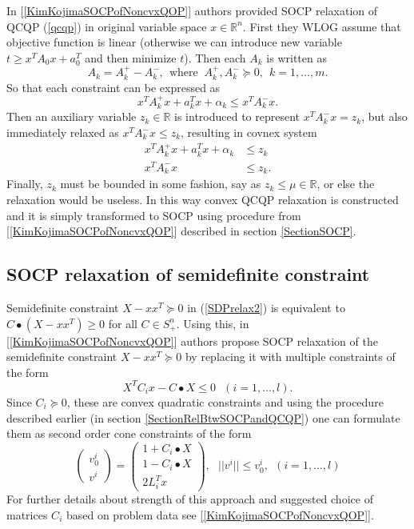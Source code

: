 \documentclass[10pt,oneside]{book}
\theoremstyle{definition}
\begin{document}
In [\ref{KimKojimaSOCPofNoncvxQOP}] authors provided SOCP relaxation of QCQP (\ref{qcqp}) in original variable space $x\in \mathbb{R}^n$. First they WLOG assume that objective function is linear (otherwise we can introduce new variable $t\geq x^TA_0x + a_0^T$ and then minimize $t$). Then each $A_k$ is written as 
$$A_k=A_k^+ -A_k^-, \ \ \mbox{where } \ A_k^+, A_k^- \succeq 0, \ \ k=1,\dots ,m.$$ 
So that each constraint can be expressed as 
$$x^TA_k^+x + a_k^Tx + \alpha_k \leq x^TA_k^-x.$$
Then an auxiliary variable $z_k\in \mathbb{R}$ is introduced to represent $x^TA_k^-x = z_k$, but also immediately relaxed as $x^TA_k^-x \leq z_k$, resulting in covnex system
\begin{equation}
\begin{array}{rl}
x^TA_k^+x + a_k^Tx + \alpha_k &\leq z_k  \\
x^TA_k^-x & \leq z_k.
\end{array} 
\end{equation}
Finally, $z_k$ must be bounded in some fashion, say as $z_k\leq \mu \in \mathbb{R}$, or else the relaxation would be useless. In this way convex QCQP relaxation is constructed and it is simply transformed to SOCP using procedure from [\ref{KimKojimaSOCPofNoncvxQOP}] described in section \ref{SectionSOCP}.

\subsection{SOCP relaxation of semidefinite constraint}

Semidefinite constraint $X-xx^T\succeq 0$  in (\ref{SDPrelax2}) is equivalent to $C\bullet(X-xx^T)\geq 0$ for all $C\in S^n_+$. Using this, in [\ref{KimKojimaSOCPofNoncvxQOP}] authors propose SOCP relaxation of the semidefinite constraint $X-xx^T\succeq 0$ by replacing it with multiple constraints of the form 
$$X^TC_ix-C\bullet X \leq 0 \ \ \ (i=1,\dots ,l).$$ 
Since $C_i\succeq 0$, these are convex quadratic constraints and using the procedure described earlier (in section \ref{SectionRelBtwSOCPandQCQP}) one can formulate them as second order cone constraints of the form
\begin{equation}
\label{SOCPRelaxOfPSDconstraint}
\left(\begin{array}{c}
v^i_0\\
v^i
\end{array}\right)
= \left(\begin{array}{c}
1+C_i\bullet X\\
1-C_i\bullet X \\
2L_i^Tx
\end{array}\right), \ \ \ ||v^i||\leq v^i_0, \ \ (i  = 1,\dots ,l)
\end{equation}
For further details about strength of this approach and suggested choice of matrices $C_i$ based on problem data see [\ref{KimKojimaSOCPofNoncvxQOP}].
\end{document}
